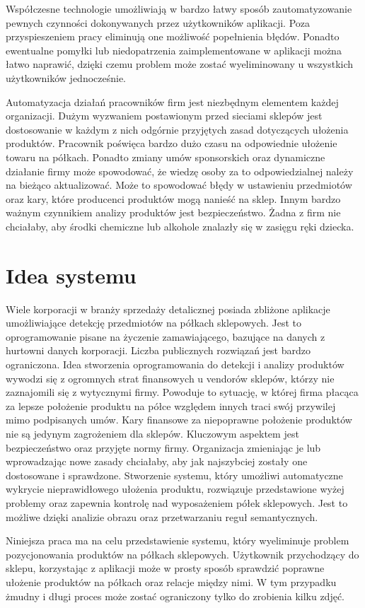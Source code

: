Współczesne technologie umożliwiają w bardzo łatwy sposób zautomatyzowanie pewnych czynności dokonywanych przez użytkowników aplikacji. Poza przyspieszeniem pracy eliminują one możliwość popełnienia błędów. Ponadto ewentualne pomyłki lub niedopatrzenia zaimplementowane w aplikacji można łatwo naprawić, dzięki czemu problem może zostać wyeliminowany u wszystkich użytkowników jednocześnie. 

Automatyzacja działań pracowników firm jest niezbędnym elementem każdej organizacji. Dużym wyzwaniem postawionym przed sieciami sklepów jest dostosowanie w każdym z nich odgórnie przyjętych zasad dotyczących ułożenia produktów. Pracownik poświęca bardzo dużo czasu na odpowiednie ułożenie towaru na półkach. Ponadto zmiany umów sponsorskich oraz dynamiczne działanie firmy może spowodować, że wiedzę osoby za to odpowiedzialnej należy na bieżąco aktualizować. Może to spowodować błędy w ustawieniu przedmiotów oraz kary, które producenci produktów mogą nanieść na sklep. Innym bardzo ważnym czynnikiem analizy produktów jest bezpieczeństwo. Żadna z firm nie chciałaby, aby środki chemiczne lub alkohole znalazły się w zasięgu ręki dziecka.

\section{Idea systemu}
Wiele korporacji w branży sprzedaży detalicznej posiada zbliżone aplikacje umożliwiające detekcję przedmiotów na półkach sklepowych. Jest to oprogramowanie pisane na życzenie zamawiającego, bazujące na danych z hurtowni danych korporacji. Liczba publicznych rozwiązań jest bardzo ograniczona. Idea stworzenia oprogramowania do detekcji i analizy produktów wywodzi się z ogromnych strat finansowych u vendorów sklepów, którzy nie zaznajomili się z wytycznymi firmy. Powoduje to sytuację, w której firma płacąca za lepsze położenie produktu na półce względem innych traci swój przywilej mimo podpisanych umów. Kary finansowe za niepoprawne położenie produktów nie są jedynym zagrożeniem dla sklepów. Kluczowym aspektem jest bezpieczeństwo oraz przyjęte normy firmy. Organizacja zmieniając je lub wprowadzając nowe zasady chciałaby, aby jak najszybciej zostały one dostosowane i sprawdzone. Stworzenie systemu, który umożliwi automatyczne wykrycie nieprawidłowego ułożenia produktu, rozwiązuje przedstawione wyżej 	problemy oraz zapewnia kontrolę nad wyposażeniem półek sklepowych. Jest to możliwe dzięki analizie obrazu oraz przetwarzaniu reguł semantycznych.

Niniejsza praca ma na celu przedstawienie systemu, który wyeliminuje problem pozycjonowania produktów na półkach sklepowych. Użytkownik przychodzący do sklepu, korzystając z aplikacji może w prosty sposób sprawdzić poprawne ułożenie produktów na półkach oraz relacje między nimi. W tym przypadku żmudny i długi proces może zostać ograniczony tylko do zrobienia kilku zdjęć. 


